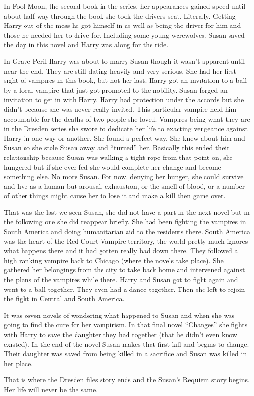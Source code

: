 \documentclass[12pt,twoside,onecolumn,openright,extrafontsizes]{memoir}
\begin{document}
{In Fool Moon, the second book in the series, her appearances gained speed until about half way through the book she took the drivers seat. Literally. Getting Harry out of the mess he got himself in as well as being the driver for him and those he needed her to drive for. Including some young werewolves. Susan saved the day in this novel and Harry was along for the ride.

In Grave Peril Harry was about to marry Susan though it wasn't apparent until near the end. They are still dating heavily and very serious. She had her first sight of vampires in this book, but not her last. Harry got an invitation to a ball by a local vampire that just got promoted to the nobility. Susan forged an invitation to get in with Harry. Harry had protection under the accords but she didn't because she was never really invited. This particular vampire held him accountable for the deaths of two people she loved. Vampires being what they are in the Dresden series she swore to dedicate her life to exacting vengeance against Harry in one way or another. She found a perfect way. She knew about him and Susan so she stole Susan away and ``turned'' her. Basically this ended their relationship because Susan was walking a tight rope from that point on, she hungered but if she ever fed she would complete her change and become something else. No more Susan. For now, denying her hunger, she could survive and live as a human but arousal, exhaustion, or the smell of blood, or a number of other things might cause her to lose it and make a kill then game over.

That was the last we seen Susan, she did not have a part in the next novel but in the following one she did reappear briefly. She had been fighting the vampires in South America and doing humanitarian aid to the residents there. South America was the heart of the Red Court Vampire territory, the world pretty much ignores what happens there and it had gotten really bad down there. They followed a high ranking vampire back to Chicago (where the novels take place). She gathered her belongings from the city to take back home and intervened against the plans of the vampires while there. Harry and Susan got to fight again and went to a ball together. They even had a dance together. Then she left to rejoin the fight in Central and South America.

It was seven novels of wondering what happened to Susan and when she was going to find the cure for her vampirism. In that final novel ``Changes'' she fights with Harry to save the daughter they had together (that he didn't even know existed). In the end of the novel Susan makes that first kill and begins to change. Their daughter was saved from being killed in a sacrifice and Susan was killed in her place.

That is where the Dresden files story ends and the Susan's Requiem story begins. Her life will never be the same.
}
		
\end{document}
